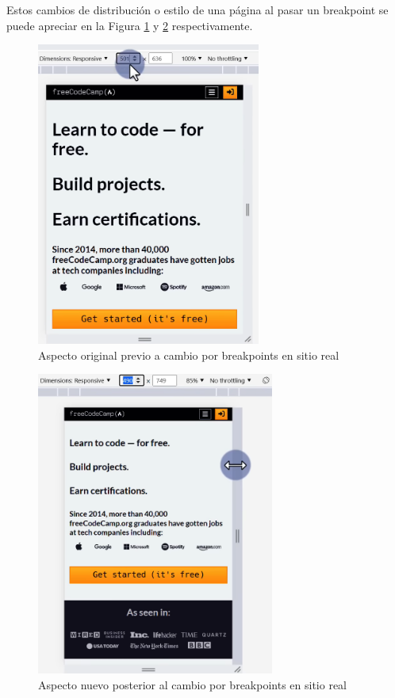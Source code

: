 Estos cambios de distribución o estilo de una página al pasar un breakpoint se puede apreciar en la Figura \ref{fig:7} y \ref{fig:8} respectivamente.
\begin{figure}[H]
    \centering
    \caption{Aspecto original previo a cambio por breakpoints en sitio real}
    \label{fig:7}
    \includegraphics[height=10cm]{ss/breakpoints1.png}
\end{figure}
\begin{figure}[H]
    \centering
    \caption{Aspecto nuevo posterior al cambio por breakpoints en sitio real}
    \label{fig:8}
    \includegraphics[height=10cm]{ss/breakpoints2.png}
\end{figure}


